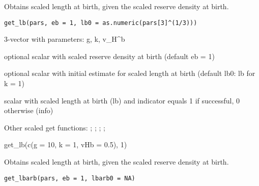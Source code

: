 \documentclass[a4paper]{book}
\begin{document}
%
\begin{Description}\relax
Obtains scaled length at birth, given the scaled reserve density at birth.
\end{Description}
%
\begin{Usage}
\begin{verbatim}
get_lb(pars, eb = 1, lb0 = as.numeric(pars[3]^(1/3)))
\end{verbatim}
\end{Usage}
%
\begin{Arguments}
\begin{ldescription}
\item[\code{pars}] 3-vector with parameters: g, k, v\_H\textasciicircum{}b

\item[\code{eb}] optional scalar with scaled reserve density at birth (default eb = 1)

\item[\code{lb0}] optional scalar with initial estimate for scaled length at birth (default lb0: lb for k = 1)
\end{ldescription}
\end{Arguments}
%
\begin{Value}
scalar with scaled length at birth (lb) and indicator equals 1 if successful, 0 otherwise (info)
\end{Value}
%
\begin{SeeAlso}\relax
Other scaled get functions: ;
; ;
;
\end{SeeAlso}
%
\begin{Examples}
\begin{ExampleCode}
get_lb(c(g = 10, k = 1, vHb = 0.5), 1)
\end{ExampleCode}
\end{Examples}
%
\begin{Description}\relax
Obtains scaled length at birth, given the scaled reserve density at birth.
\end{Description}
%
\begin{Usage}
\begin{verbatim}
get_lbarb(pars, eb = 1, lbarb0 = NA)
\end{verbatim}
\end{Usage}
\end{document}

